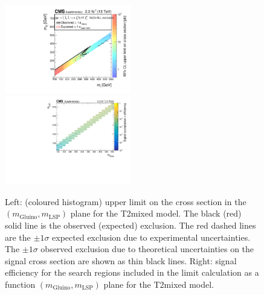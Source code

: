 \clearpage
\begin{figure}[t]
  \begin{center}
    \includegraphics[width=0.49\textwidth]{RA1T2mixedXSEC_aux} \, 
    \includegraphics[width=0.49\textwidth]{T2mixed_merging_4_cats_aux} \,     
  \end{center}
  \caption{Left: (coloured histogram) upper limit on the cross section in the $(m_{\mathrm{Gluino}},m_{\mathrm{LSP}})$ plane for the T2mixed model. 
  The black (red) solid line is the observed (expected) exclusion. The red dashed lines are the $\pm1\sigma$ expected exclusion due to experimental uncertainties. 
  The $\pm1\sigma$ observed exclusion due to theoretical uncertainties on the signal cross section are shown as thin black lines. 
  Right: signal efficiency for the search regions included in the limit calculation as a function $(m_{\mathrm{Gluino}},m_{\mathrm{LSP}})$ plane for the T2mixed model. 
  \label{fig:T2mixed_excl}}
\end{figure}

